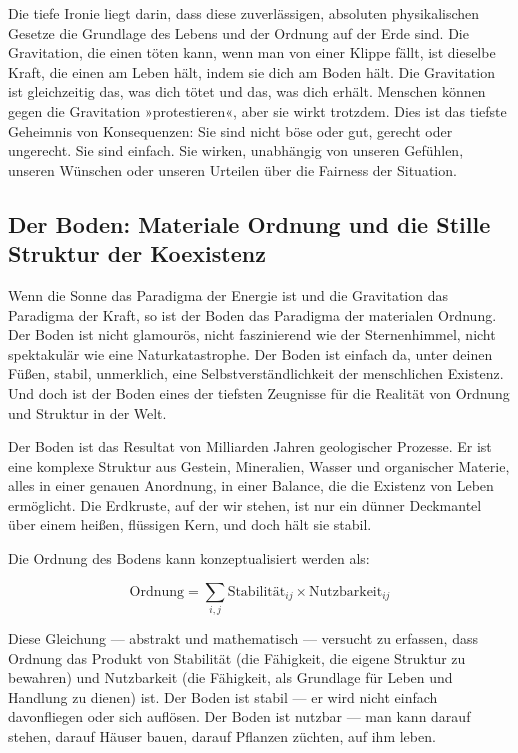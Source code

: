 \documentclass[12pt,a4paper]{article}
\begin{document}
Die tiefe Ironie liegt darin, dass diese zuverlässigen, absoluten physikalischen Gesetze die Grundlage des Lebens und der Ordnung auf der Erde sind. Die Gravitation, die einen töten kann, wenn man von einer Klippe fällt, ist dieselbe Kraft, die einen am Leben hält, indem sie dich am Boden hält. Die Gravitation ist gleichzeitig das, was dich tötet und das, was dich erhält. Menschen können gegen die Gravitation »protestieren«, aber sie wirkt trotzdem. Dies ist das tiefste Geheimnis von Konsequenzen: Sie sind nicht böse oder gut, gerecht oder ungerecht. Sie sind einfach. Sie wirken, unabhängig von unseren Gefühlen, unseren Wünschen oder unseren Urteilen über die Fairness der Situation.

\subsection{Der Boden: Materiale Ordnung und die Stille Struktur der Koexistenz}

Wenn die Sonne das Paradigma der Energie ist und die Gravitation das Paradigma der Kraft, so ist der Boden das Paradigma der materialen Ordnung. Der Boden ist nicht glamourös, nicht faszinierend wie der Sternenhimmel, nicht spektakulär wie eine Naturkatastrophe. Der Boden ist einfach da, unter deinen Füßen, stabil, unmerklich, eine Selbstverständlichkeit der menschlichen Existenz. Und doch ist der Boden eines der tiefsten Zeugnisse für die Realität von Ordnung und Struktur in der Welt.

Der Boden ist das Resultat von Milliarden Jahren geologischer Prozesse. Er ist eine komplexe Struktur aus Gestein, Mineralien, Wasser und organischer Materie, alles in einer genauen Anordnung, in einer Balance, die die Existenz von Leben ermöglicht. Die Erdkruste, auf der wir stehen, ist nur ein dünner Deckmantel über einem heißen, flüssigen Kern, und doch hält sie stabil.

Die Ordnung des Bodens kann konzeptualisiert werden als:

\begin{equation}
\text{Ordnung} = \sum_{i,j} \text{Stabilität}_{ij} \times \text{Nutzbarkeit}_{ij}
\end{equation}

Diese Gleichung — abstrakt und mathematisch — versucht zu erfassen, dass Ordnung das Produkt von Stabilität (die Fähigkeit, die eigene Struktur zu bewahren) und Nutzbarkeit (die Fähigkeit, als Grundlage für Leben und Handlung zu dienen) ist. Der Boden ist stabil — er wird nicht einfach davonfliegen oder sich auflösen. Der Boden ist nutzbar — man kann darauf stehen, darauf Häuser bauen, darauf Pflanzen züchten, auf ihm leben.
\end{document}
